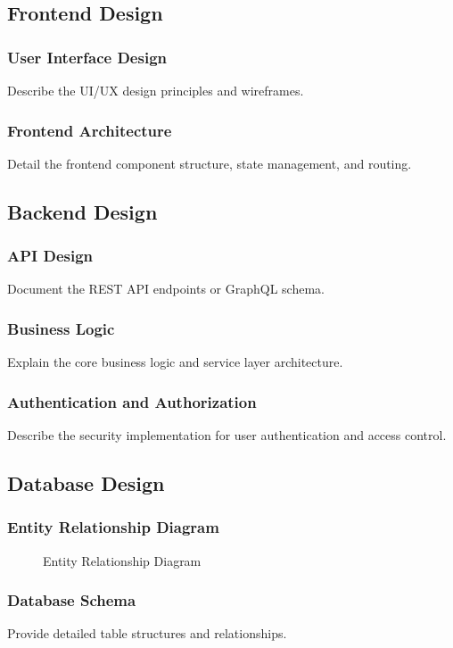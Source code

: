 \documentclass[12pt,a4paper]{article}
\begin{document}
\subsection{Frontend Design}
\subsubsection{User Interface Design}
Describe the UI/UX design principles and wireframes.

\subsubsection{Frontend Architecture}
Detail the frontend component structure, state management, and routing.

\subsection{Backend Design}
\subsubsection{API Design}
Document the REST API endpoints or GraphQL schema.

\subsubsection{Business Logic}
Explain the core business logic and service layer architecture.

\subsubsection{Authentication and Authorization}
Describe the security implementation for user authentication and access control.

\subsection{Database Design}
\subsubsection{Entity Relationship Diagram}
\begin{figure}[H]
    \centering
    \caption{Entity Relationship Diagram}
    \label{fig:erd}
\end{figure}

\subsubsection{Database Schema}
Provide detailed table structures and relationships.
\end{document}
